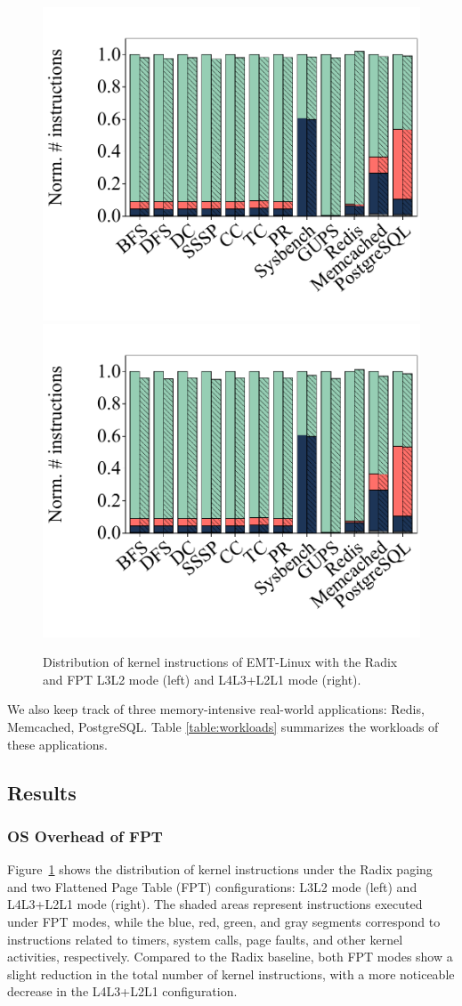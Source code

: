 \begin{figure}
    \centering
    \includegraphics[width=0.495\linewidth]{graph/kern_inst_unified_never_L3L2.pdf} \includegraphics[width=0.495\linewidth]{graph/kern_inst_unified_never_L4L3L2L1.pdf}
    \caption{Distribution of kernel instructions of EMT-Linux with the Radix and FPT L3L2 mode (left) and L4L3+L2L1 mode (right).}
    \label{fig:kernel_inst}
\end{figure}

We also keep track of three memory-intensive real-world applications:
    Redis,
    Memcached,
    PostgreSQL.
Table \ref{table:workloads} summarizes the workloads of these applications.


\subsection{Results}

\subsubsection{OS Overhead of FPT}

Figure~\ref{fig:kernel_inst} shows the distribution of kernel instructions under the Radix paging and two Flattened Page Table (FPT) configurations: L3L2 mode (left) and L4L3+L2L1 mode (right). The shaded areas represent instructions executed under FPT modes, while the blue, red, green, and gray segments correspond to instructions related to timers, system calls, page faults, and other kernel activities, respectively. Compared to the Radix baseline, both FPT modes show a slight reduction in the total number of kernel instructions, with a more noticeable decrease in the L4L3+L2L1 configuration.

